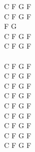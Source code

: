 \begin{chord}
C F G F\\
C F G F\\
F G\\
C F G F\\
C F G F\\

\vin \\
C F G F\\
C F G F\\
C F G F\\
C F G F\\

C F G F\\
C F G F\\
C F G F\\
C F G F\\

C F G F\\
\end{chord}
